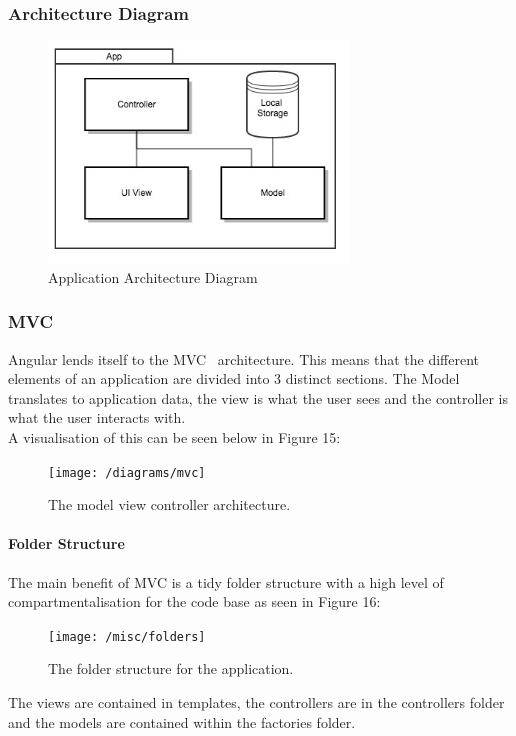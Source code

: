 \documentclass[preprint,12pt,3p]{elsarticle}
\begin{document}
\subsubsection{Architecture Diagram}
\begin{figure}[H]
    \centering
    \includegraphics[width=8cm]{diagrams/app}
    \caption {Application Architecture Diagram}
\end{figure}

\subsubsection{MVC}
Angular lends itself to the MVC~\cite{mvc} architecture. This means that the different elements of an application are divided into 3 distinct sections. The Model translates to application data, the view is what the user sees and the controller is what the user interacts with.\\

A visualisation of this can be seen below in Figure 15:
\begin{figure}[H]
    \centering
    \texttt{[image: /diagrams/mvc]}
    \caption {The model view controller architecture.~\cite{mvcimage}}
\end{figure}

\paragraph{Folder Structure}
The main benefit of MVC is a tidy folder structure with a high level of compartmentalisation for the code base as seen in Figure 16:

\begin{figure}[H]
    \centering
    \texttt{[image: /misc/folders]}
    \caption {The folder structure for the application.}
\end{figure}
The views are contained in templates, the controllers are in the controllers folder and the models are contained within the factories folder.\\
\end{document}

